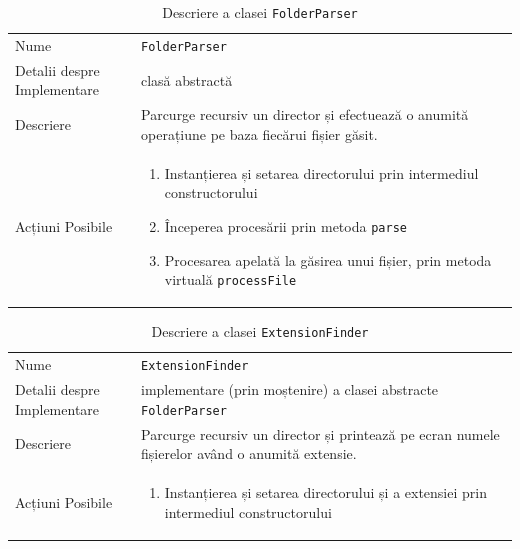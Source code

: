 \documentclass[12pt]{article}
\begin{document}
\begin{table}[H]
    \centering
    \begin{tabular}{ |p{0.25\linewidth} | p{0.75\linewidth}| } 
        \hline
        Nume & \texttt{FolderParser} \\
        Detalii despre Implementare & clasă abstractă \\
        Descriere & Parcurge recursiv un director și efectuează o anumită operațiune pe baza fiecărui fișier găsit. \\
        Acțiuni Posibile & \begin{enumerate}
                               \item Instanțierea și setarea directorului prin intermediul constructorului
                               \item Începerea procesării prin metoda \texttt{parse}
                               \item Procesarea apelată la găsirea unui fișier, prin metoda virtuală \texttt{processFile}
                           \end{enumerate} \\
        \hline
    \end{tabular}
    \caption{Descriere a clasei \texttt{FolderParser}}
    \label{table:1}
\end{table}

\newpage

\begin{table}[H]
    \centering
    \begin{tabular}{ |p{0.25\linewidth} | p{0.75\linewidth}| } 
        \hline
        Nume & \texttt{ExtensionFinder} \\
        Detalii despre Implementare & implementare (prin moștenire) a clasei abstracte \texttt{FolderParser} \\
        Descriere & Parcurge recursiv un director și printează pe ecran numele fișierelor având o anumită extensie. \\
        Acțiuni Posibile & \begin{enumerate}
                               \item Instanțierea și setarea directorului și a extensiei prin intermediul constructorului
                           \end{enumerate} \\
        \hline
    \end{tabular}
    \caption{Descriere a clasei \texttt{ExtensionFinder}}
    \label{table:1}
\end{table}
\end{document}
